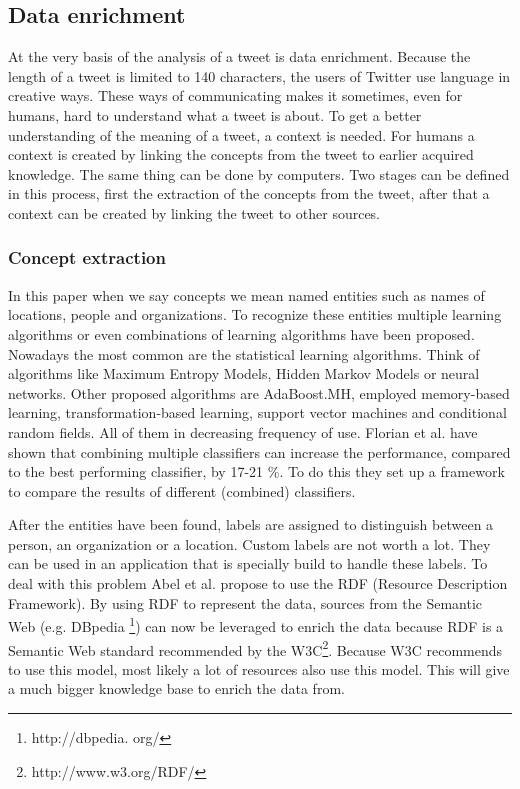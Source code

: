 \documentclass{article}
\begin{document}
\subsection{Data enrichment}
At the very basis of the analysis of a tweet is data enrichment. Because the length of a tweet is limited to 140 characters, the users of Twitter use language in creative ways. These ways of communicating makes it sometimes, even for humans, hard to understand what a tweet is about. To get a better understanding of the meaning of a tweet, a context is needed. For humans a context is created by linking the concepts from the tweet to earlier acquired knowledge. The same thing can be done by computers. Two stages can be defined in this process, first the extraction of the concepts from the tweet, after that a context can be created by linking the tweet to other sources.
\subsubsection{Concept extraction}
In this paper when we say concepts we mean named entities such as names of locations, people and organizations. To recognize these entities multiple learning algorithms or even combinations of learning algorithms have been proposed. Nowadays the most common are the statistical learning algorithms. Think of algorithms like Maximum Entropy Models, Hidden Markov Models or neural networks. Other proposed algorithms are AdaBoost.MH, employed memory-based learning, transformation-based learning, support vector machines and conditional random fields. All of them in decreasing frequency of use.\cite{EntityRecognition} Florian et al. have shown that combining multiple classifiers can increase the performance, compared to the best performing classifier, by 17-21 \%.\cite{ClassifierCombination} To do this they set up a framework to compare the results of different (combined) classifiers.  

After the entities have been found, labels are assigned to distinguish between a person, an organization or a location. Custom labels are not worth a lot. They can be used in an application that is specially build to handle these labels. To deal with this problem Abel et al. propose to use the RDF (Resource Description Framework).\cite{AdaptiveSearch} By using RDF to represent the data, sources from the Semantic Web (e.g. DBpedia \footnote{http://dbpedia.
org/}) can now be leveraged to enrich the data because RDF is a Semantic Web standard recommended by the W3C\footnote{http://www.w3.org/RDF/}. Because W3C recommends to use this model, most likely a lot of resources also use this model. This will give a much bigger knowledge base to enrich the data from.
\end{document}
